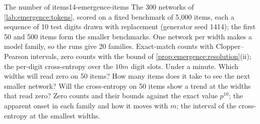 \begin{refsection}
\begin{lab}{The number of items}{14-emergence-items}\label{lab:emergence:items}
 The 300 networks of \cref{lab:emergence:tokens}, scored on a fixed benchmark of 5,000 items, each a sequence of 10 test digits drawn with replacement (generator seed 1414); the first 50 and 500 items form the smaller benchmarks. One network per width makes a model family, so the runs give 20 families. Exact-match counts with Clopper--Pearson intervals, zero counts with the bound of \cref{prop:emergence:resolution}(ii); the per-digit cross-entropy over the $10m$ digit slots. Under a minute.
 Which widths will read zero on 50 items? How many items does it take to see the next smaller network? Will the cross-entropy on 50 items show a trend at the widths that read zero?
 Zero counts and their bounds against the exact value $p^{10}$; the apparent onset in each family and how it moves with $m$; the interval of the cross-entropy at the smallest widths.
\end{lab}


\end{refsection}
